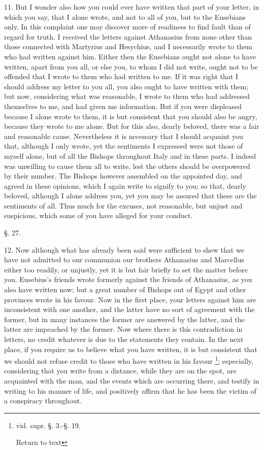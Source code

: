 11. But I wonder also how you could ever have
written that part of your letter, in which you say, that I alone
wrote, and not to all of you, but to the Eusebians only. In this
complaint one may discover more of readiness to find fault than of
regard for truth. I received the letters against Athanasius from none
other than those connected with Martyrius and Hesychius, and I
necessarily wrote to them who had written against him. Either then the
Eusebians ought not alone to have written, apart from you all, or else
you, to whom I did not write, ought not to be offended that I wrote to
them who had written to me. If it was right that I should address my
letter to you all, you also ought to have written with them; but now,
considering what was reasonable, I wrote to them who had addressed
themselves to me, and had given me information. But if you were
displeased because I alone wrote to them, it is but consistent that
you should also be angry, because they wrote to me alone. But for this
also, dearly beloved, there was a fair and reasonable cause.
Nevertheless it is necessary that I should acquaint you that, although
I only wrote, yet the sentiments I expressed were not those of myself
alone, but of all the Bishops throughout Italy and in these parts. I
indeed was unwilling to cause them all to write, lest the others
should be overpowered by their number. The Bishops however assembled
on the appointed day, and agreed in these opinions, which I again
write to signify to you; so that, dearly beloved, although I alone
address you, yet you may be assured that these are the sentiments of
all. Thus much for the excuses, not reasonable, but unjust and
suspicious, which some of you have alleged for your conduct.

§. 27.

12. Now although what has already been said were
sufficient to shew that we have not admitted to our communion our
brothers Athanasius and Marcellus either too readily, or unjustly, yet
it is but fair briefly to set the matter before you. Eusebius's
friends wrote formerly against the friends of Athanasius, as you also
have written now; but a great number of Bishops out of Egypt and other
provinces wrote in his favour. Now in the first place, your letters
against him are inconsistent with one another, and the latter have no
sort of agreement with the former, but in many instances the former
are answered by the latter, and the latter are impeached by the
former. Now where there is this contradiction in letters, no credit
whatever is due to the statements they contain. In the next place, if
you require us to believe what you have written, it is but consistent
that we should not refuse credit to those who have written in his
favour \footnote{vid. supr. §. 3.-§. 19.

Return to text}; especially,
considering that you write from a distance, while they are on the
spot, are acquainted with the man, and the events which are occurring
there, and testify in writing to his manner of life, and positively
affirm that he has been the victim of a conspiracy throughout.

